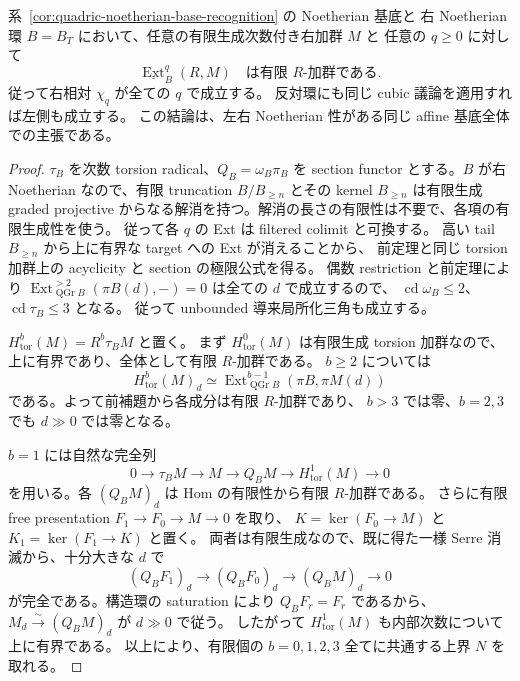 \begin{lemma}
\label{lem:relative-cubic-global-chi}
系~\ref{cor:quadric-noetherian-base-recognition} の Noetherian 基底と
右 Noetherian 環 $B=B_T$ において、任意の有限生成次数付き右加群 $M$ と
任意の $q\ge0$ に対して
\[
   \underline{\operatorname{Ext}}^q_B(R,M)
   \quad\text{は有限 }R\text{-加群である}.
\]
従って右相対 $\chi_q$ が全ての $q$ で成立する。
反対環にも同じ cubic 議論を適用すれば左側も成立する。
この結論は、左右 Noetherian 性がある同じ affine 基底全体での主張である。
\end{lemma}
\begin{proof}
$\tau_B$ を次数 torsion radical、$Q_B=\omega_B\pi_B$ を section functor
とする。$B$ が右 Noetherian なので、有限 truncation
$B/B_{\ge n}$ とその kernel $B_{\ge n}$ は有限生成 graded projective
からなる解消を持つ。解消の長さの有限性は不要で、各項の有限生成性を使う。
従って各 $q$ の Ext は filtered colimit と可換する。
高い tail $B_{\ge n}$ から上に有界な target への Ext が消えることから、
前定理と同じ torsion 加群上の acyclicity と section の極限公式を得る。
偶数 restriction と前定理により
$\operatorname{Ext}^{>2}_{\operatorname{QGr}B}
(\pi B(d),-)=0$ は全ての $d$ で成立するので、
$\operatorname{cd}\omega_B\le2$、$\operatorname{cd}\tau_B\le3$ となる。
従って unbounded 導来局所化三角も成立する。

$H^b_{\mathrm{tor}}(M)=R^b\tau_B M$ と置く。
まず $H^0_{\mathrm{tor}}(M)$ は有限生成 torsion 加群なので、
上に有界であり、全体として有限 $R$-加群である。
$b\ge2$ については
\[
 H^b_{\mathrm{tor}}(M)_d
 \simeq\operatorname{Ext}^{b-1}_{\operatorname{QGr}B}
                 (\pi B,\pi M(d))
\]
である。よって前補題から各成分は有限 $R$-加群であり、
$b>3$ では零、$b=2,3$ でも $d\gg0$ では零となる。

$b=1$ には自然な完全列
\[
 0\to\tau_B M\to M\to Q_BM\to H^1_{\mathrm{tor}}(M)\to0
\]
を用いる。各 $(Q_BM)_d$ は Hom の有限性から有限 $R$-加群である。
さらに有限 free presentation $F_1\to F_0\to M\to0$ を取り、
$K=\ker(F_0\to M)$ と $K_1=\ker(F_1\to K)$ と置く。
両者は有限生成なので、既に得た一様 Serre 消滅から、十分大きな $d$ で
\[
 (Q_BF_1)_d\longrightarrow(Q_BF_0)_d\longrightarrow(Q_BM)_d
 \longrightarrow0
\]
が完全である。構造環の saturation により $Q_BF_r=F_r$ であるから、
$M_d\xrightarrow{\sim}(Q_BM)_d$ が $d\gg0$ で従う。
したがって $H^1_{\mathrm{tor}}(M)$ も内部次数について上に有界である。
以上により、有限個の $b=0,1,2,3$ 全てに共通する上界 $N$ を取れる。


\end{proof}

